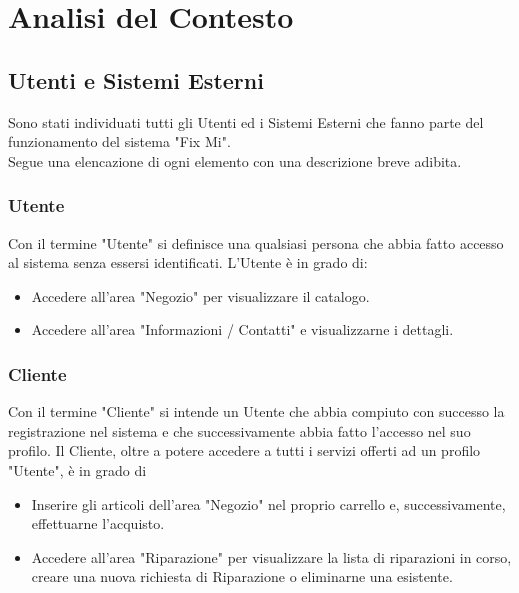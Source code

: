 \documentclass{report}
\begin{document}
\chapter{Analisi del Contesto}

\section{Utenti e Sistemi Esterni}

Sono stati individuati tutti gli Utenti ed i Sistemi Esterni che fanno parte del funzionamento del sistema "Fix Mi".\\Segue una elencazione di ogni elemento con una descrizione breve adibita.


\subsection{Utente}
Con il termine "Utente" si definisce una qualsiasi persona che abbia fatto accesso al sistema senza essersi identificati. L'Utente è in grado di:
\begin{itemize}
	\item Accedere all'area "Negozio" per visualizzare il catalogo.
	\item Accedere all'area "Informazioni / Contatti" e visualizzarne i dettagli. 
\end{itemize}


\subsection{Cliente}

Con il termine "Cliente" si intende un Utente che abbia compiuto con successo la registrazione nel sistema e che successivamente abbia fatto l'accesso nel suo profilo. Il Cliente, oltre a potere accedere a tutti i servizi offerti ad un profilo "Utente", è in grado di
\begin{itemize}
	\item Inserire gli articoli dell'area "Negozio" nel proprio carrello e, successivamente, effettuarne l'acquisto.
	\item Accedere all'area "Riparazione" per visualizzare la lista di riparazioni in corso, creare una nuova richiesta di Riparazione o eliminarne una esistente.
\end{itemize}
\end{document}
